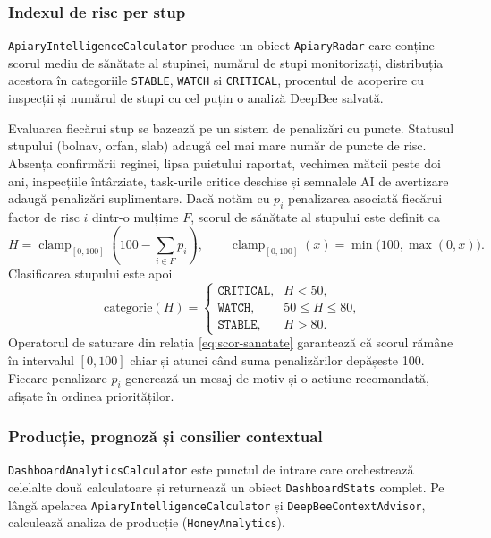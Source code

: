 \subsubsection*{Indexul de risc per stup}

\texttt{ApiaryIntelligenceCalculator} produce un obiect \texttt{ApiaryRadar} care conține scorul mediu de sănătate al stupinei, numărul de stupi monitorizați, distribuția acestora în categoriile \texttt{STABLE}, \texttt{WATCH} și \texttt{CRITICAL}, procentul de acoperire cu inspecții și numărul de stupi cu cel puțin o analiză DeepBee salvată.

Evaluarea fiecărui stup se bazează pe un sistem de penalizări cu puncte. Statusul stupului (bolnav, orfan, slab) adaugă cel mai mare număr de puncte de risc. Absența confirmării reginei, lipsa puietului raportat, vechimea mătcii peste doi ani, inspecțiile întârziate, task-urile critice deschise și semnalele AI de avertizare adaugă penalizări suplimentare. Dacă notăm cu $p_i$ penalizarea asociată fiecărui factor de risc $i$ dintr-o mulțime $F$, scorul de sănătate al stupului este definit ca
\begin{equation}
	H = \operatorname{clamp}_{[0,100]}\!\left(100 - \sum_{i \in F} p_i\right),
	\qquad
	\operatorname{clamp}_{[0,100]}(x) = \min\bigl(100, \max(0, x)\bigr).
	\label{eq:scor-sanatate}
\end{equation}
Clasificarea stupului este apoi
\begin{equation}
	\text{categorie}(H) =
	\begin{cases}
		\texttt{CRITICAL}, & H < 50,\\
		\texttt{WATCH},    & 50 \le H \le 80,\\
		\texttt{STABLE},   & H > 80.
	\end{cases}
	\label{eq:categorie-stup}
\end{equation}
Operatorul de saturare din relația \eqref{eq:scor-sanatate} garantează că scorul rămâne în intervalul $[0, 100]$ chiar și atunci când suma penalizărilor depășește 100. Fiecare penalizare $p_i$ generează un mesaj de motiv și o acțiune recomandată, afișate în ordinea priorităților.

\subsubsection*{Producție, prognoză și consilier contextual}

\texttt{DashboardAnalyticsCalculator} este punctul de intrare care orchestrează celelalte două calculatoare și returnează un obiect \texttt{DashboardStats} complet. Pe lângă apelarea \texttt{ApiaryIntelligenceCalculator} și \texttt{DeepBeeContextAdvisor}, calculează analiza de producție (\texttt{HoneyAnalytics}).

